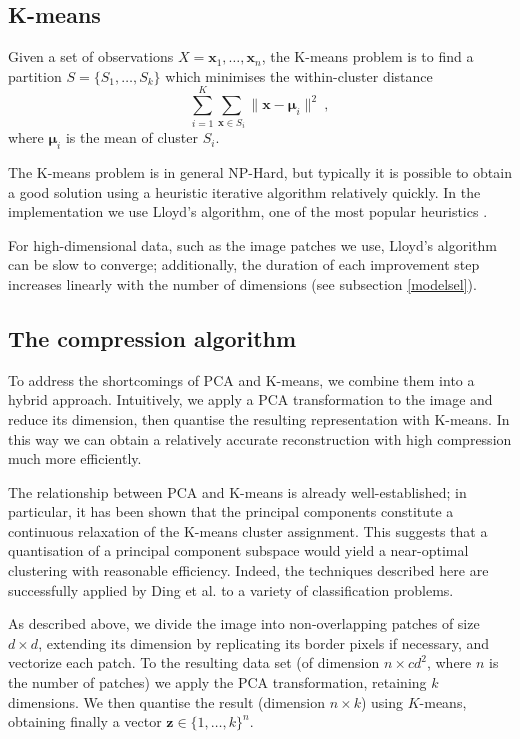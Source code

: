 \subsection{K-means}
Given a set of observations $X = \mathbf{x}_1, \ldots, \mathbf{x}_n$, the K-means problem is to find a partition $S = \{S_1, \ldots, S_k\}$ which minimises the within-cluster distance
\begin{equation*}
    \sum_{i=1}^K \sum_{\mathbf{x} \in S_i} \|\mathbf{x} - \mathbf{\mu}_i\|^2 ~ ,
\end{equation*}
where $\mathbf{\mu}_i$ is the mean of cluster $S_i$.

The K-means problem is in general NP-Hard, but typically it is possible to obtain a good solution using a heuristic iterative algorithm relatively quickly. In the implementation we use Lloyd's algorithm, one of the most popular heuristics \cite[pp. 347--349]{jones2004introduction}.

For high-dimensional data, such as the image patches we use, Lloyd's algorithm can be slow to converge; additionally, the duration of each improvement step increases linearly with the number of dimensions (see subsection \ref{modelsel}).

\subsection{The compression algorithm}
To address the shortcomings of PCA and K-means, we combine them into a hybrid approach. Intuitively, we apply a PCA transformation to the image and reduce its dimension, then quantise the resulting representation with K-means. In this way we can obtain a relatively accurate reconstruction with high compression much more efficiently.

The relationship between PCA and K-means is already well-established; in particular, it has been shown \cite{ding2004} that the principal components constitute a continuous relaxation of the K-means cluster assignment. This suggests that a quantisation of a principal component subspace would yield a near-optimal clustering with reasonable efficiency. Indeed, the techniques described here are successfully applied by Ding et al. \cite{ding2004} to a variety of classification problems.

As described above, we divide the image into non-overlapping patches of size $d \times d$, extending its dimension by replicating its border pixels if necessary, and vectorize each patch. To the resulting data set (of dimension $n \times cd^2$, where $n$ is the number of patches) we apply the PCA transformation, retaining $k$ dimensions. We then quantise the result (dimension $n \times k$) using $K$-means, obtaining finally a vector $\mathbf{z} \in \{1, \ldots, k\}^n$.

